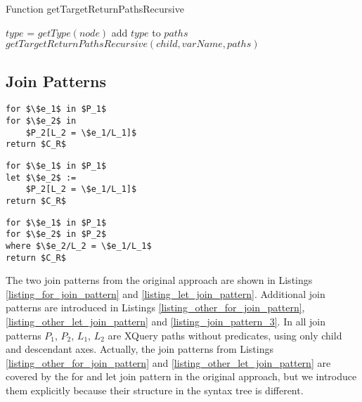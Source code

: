 \begin{algorithm}
\caption{Function getTargetReturnPathsRecursive}
\label{ALG_function_get_target_return_paths_recursive}
\begin{algorithmic}[1]

	\STATE $type$ = $getType(node)$
		\STATE add $type$ to $paths$
	\ENDIF
\ENDIF
{}
	\STATE $getTargetReturnPathsRecursive(child, varName, paths)$
\ENDFOR
\end{algorithmic}
\end{algorithm}

\subsection{Join Patterns}

\begin{lstlisting}[mathescape, float, caption=Other form of the for join pattern., frame=single, label=listing_other_for_join_pattern]
for $\$e_1$ in $P_1$
for $\$e_2$ in
    $P_2[L_2 = \$e_1/L_1]$
return $C_R$
\end{lstlisting}

\begin{lstlisting}[mathescape, float, caption=Other form of the let join pattern., frame=single, label=listing_other_let_join_pattern]
for $\$e_1$ in $P_1$
let $\$e_2$ :=
    $P_2[L_2 = \$e_1/L_1]$
return $C_R$
\end{lstlisting}

\begin{lstlisting}[mathescape, float, caption=Join pattern 3., frame=single, label=listing_join_pattern_3]
for $\$e_1$ in $P_1$
for $\$e_2$ in $P_2$
where $\$e_2/L_2 = \$e_1/L_1$
return $C_R$
\end{lstlisting}

The two join patterns from the original approach are shown in Listings \ref{listing_for_join_pattern} and \ref{listing_let_join_pattern}. Additional join patterns are introduced in Listings \ref{listing_other_for_join_pattern}, \ref{listing_other_let_join_pattern} and \ref{listing_join_pattern_3}. In all join patterns $P_1$, $P_2$, $L_1$, $L_2$ are XQuery paths without predicates, using only child and descendant axes. Actually, the join patterns from Listings \ref{listing_other_for_join_pattern} and \ref{listing_other_let_join_pattern} are covered by the for and let join pattern in the original approach, but we introduce them explicitly because their structure in the syntax tree is different.

